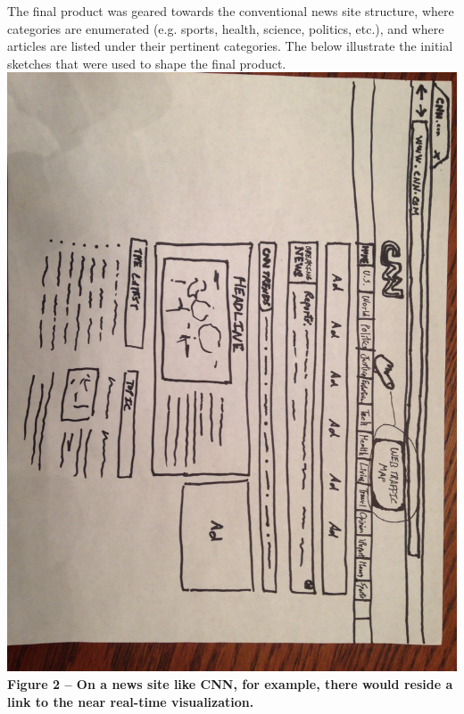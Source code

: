 \documentclass[12pt]{article}
\begin{document}
The final product was geared towards the conventional news site structure, where categories are enumerated (e.g. sports, health, science, politics, etc.), and where articles are listed under their pertinent categories. The below illustrate the initial sketches that were used to shape the final product.\\

\noindent\includegraphics[scale=0.2]{img/cnn_example}
\noindent\textbf{Figure 2 -- On a news site like CNN, for example, there would reside a link to the near real-time visualization.}
\end{document}

